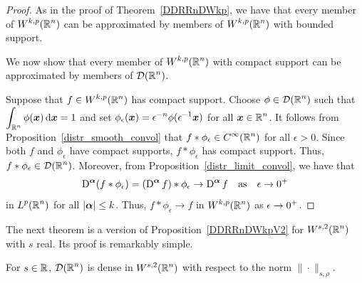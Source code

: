 \begin{proof}
As in the proof of Theorem~\ref{DDRRnDWkp}, we have that every member of
$\displaystyle W^{k,p}(\mathbb{R}^n)$ can be approximated by members of
$\displaystyle W^{k,p}(\mathbb{R}^n)$ with bounded support.

We now show that every member of $\displaystyle W^{k,p}(\mathbb{R}^n)$ with
compact support can be approximated by members of $\displaystyle \mathcal{D}(\mathbb{R}^n)$.

Suppose that $\displaystyle f \in W^{k,p}(\mathbb{R}^n)$ has compact
support.  Choose $\displaystyle \phi \in \mathcal{D}(\mathbb{R}^n)$ such that\\
$\displaystyle \int_{\mathbb{R}^n} \phi({\bm{x}}) \,\mathrm{d}{{\bm{x}}} = 1$
and set
$\displaystyle \phi_\epsilon({\bm{x}}) = \epsilon^{-n}\phi(\epsilon^{-1} {\bm{x}})$
for all $\displaystyle {\bm{x}} \in \mathbb{R}^n$.
It follows from Proposition~\ref{distr_smooth_convol} that
$\displaystyle f \ast \phi_{\epsilon} \in C^\infty(\mathbb{R}^n)$ for all $\epsilon>0$.
Since both $f$ and $\phi_\epsilon$ have compact supports, 
$f \ast \phi_{\epsilon}$ has compact support.  Thus,
$\displaystyle f \ast \phi_{\epsilon} \in \mathcal{D}(\mathbb{R}^n)$.  Moreover, from 
Proposition~\ref{distr_limit_convol}, we have that
\[
  \operatorname{D}^{{\bm{\alpha}}} (f \ast \phi_\epsilon)
  = (\operatorname{D}^{{\bm{\alpha}}} f) \ast \phi_\epsilon \to \operatorname{D}^{{\bm{\alpha}}} f
\quad \text{as} \quad \epsilon \to 0^+
\]
in $\displaystyle L^p(\mathbb{R}^n)$ for all $|{\bm{\alpha}}| \leq k$.  Thus,
$f \ast \phi_{\epsilon} \to f$ in $\displaystyle W^{k,p}(\mathbb{R}^n)$ as
$\displaystyle \epsilon \to 0^+$.
\end{proof}

The next theorem is a version of Proposition~\ref{DDRRnDWkpV2} for
$\displaystyle W^{s,2}(\mathbb{R}^n)$ with $s$ real.  Its proof is remarkably simple.

\begin{theorem} \label{DDRRnDWs2}
For $s\in \mathbb{R}$, $\displaystyle \mathcal{D}(\mathbb{R}^n)$ is dense in
$\displaystyle W^{s,2}(\mathbb{R}^n)$ with
respect to the norm $\|\cdot\|_{s,\rho}$.
\end{theorem}


